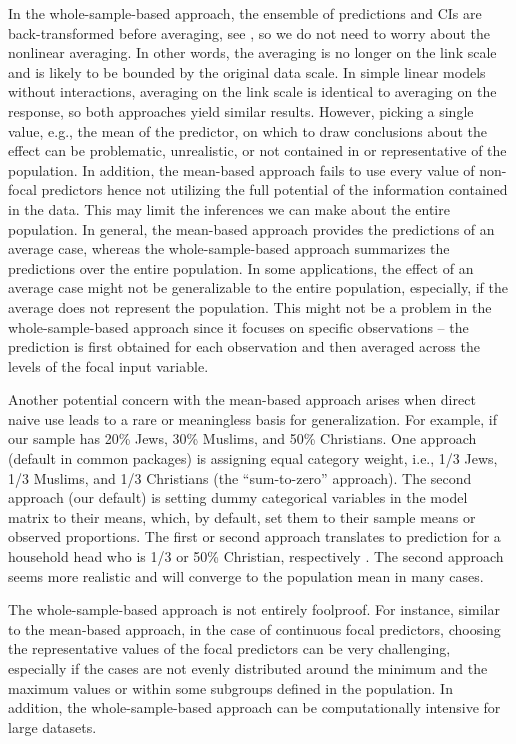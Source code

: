 In the whole-sample-based approach, the ensemble of predictions and CIs are back-transformed before averaging, see , so we do not need to worry about the nonlinear averaging. In other words, the averaging is no longer on the link scale and is likely to be bounded by the original data scale. In simple linear models without interactions, averaging on the link scale is identical to averaging on the response, so both approaches yield similar results. However, picking a single value, e.g., the mean of the predictor, on which to draw conclusions about the effect can be problematic, unrealistic, or not contained in or representative of the population. In addition, the mean-based approach fails to use every value of non-focal predictors hence not utilizing the full potential of the information contained in the data. This may limit the inferences we can make about the entire population. In general, the mean-based approach provides the predictions of an average case, whereas the whole-sample-based approach summarizes the predictions over the entire population. In some applications, the effect of an average case might not be generalizable to the entire population, especially, if the average does not represent the population. This might not be a problem in the whole-sample-based approach since it focuses on specific observations -- the prediction is first obtained for each observation and then averaged across the levels of the focal input variable.

Another potential concern with the mean-based approach arises when direct naive use leads to a rare or meaningless basis for generalization. For example, if our sample has 20\% Jews, 30\% Muslims, and 50\% Christians. One approach (default in common packages) is assigning equal category weight, i.e., 1/3 Jews, 1/3 Muslims, and 1/3 Christians (the ``sum-to-zero'' approach). The second approach (our default) is setting dummy categorical variables in the model matrix to their means, which, by default, set them to their sample means or observed proportions. The first or second approach translates to prediction for a household head who is 1/3 or 50\% Christian, respectively \citep{hanmer2013behind}. The second approach seems more realistic and will converge to the population mean in many cases.

The whole-sample-based approach is not entirely foolproof. For instance, similar to the mean-based approach, in the case of continuous focal predictors, choosing the representative values of the focal predictors can be very challenging, especially if the cases are not evenly distributed around the minimum and the maximum values or within some subgroups defined in the population. In addition, the whole-sample-based approach can be computationally intensive for large datasets.



